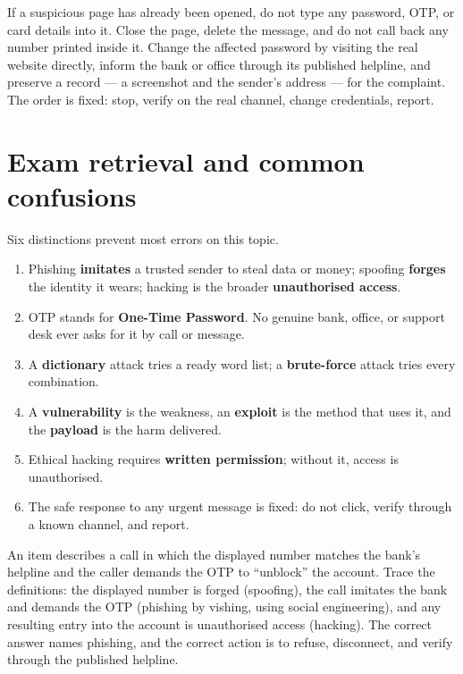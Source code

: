 If a suspicious page has already been opened, do not type any password,
OTP, or card details into it. Close the page, delete the message, and
do not call back any number printed inside it. Change the affected
password by visiting the real website directly, inform the bank or
office through its published helpline, and preserve a record --- a
screenshot and the sender's address --- for the complaint. The order is
fixed: stop, verify on the real channel, change credentials, report.

\section{Exam retrieval and common confusions}
Six distinctions prevent most errors on this topic.
\begin{enumerate}
  \item Phishing \textbf{imitates} a trusted sender to steal data or
    money; spoofing \textbf{forges} the identity it wears; hacking is
    the broader \textbf{unauthorised access}.
  \item OTP stands for \textbf{One-Time Password}. No genuine bank,
    office, or support desk ever asks for it by call or message.
  \item A \textbf{dictionary} attack tries a ready word list; a
    \textbf{brute-force} attack tries every combination.
  \item A \textbf{vulnerability} is the weakness, an \textbf{exploit} is
    the method that uses it, and the \textbf{payload} is the harm
    delivered.
  \item Ethical hacking requires \textbf{written permission}; without
    it, access is unauthorised.
  \item The safe response to any urgent message is fixed: do not click,
    verify through a known channel, and report.
\end{enumerate}

\begin{example}
An item describes a call in which the displayed number matches the
bank's helpline and the caller demands the OTP to ``unblock'' the
account. Trace the definitions: the displayed number is forged
(spoofing), the call imitates the bank and demands the OTP (phishing by
vishing, using social engineering), and any resulting entry into the
account is unauthorised access (hacking). The correct answer names
phishing, and the correct action is to refuse, disconnect, and verify
through the published helpline.
\end{example}

